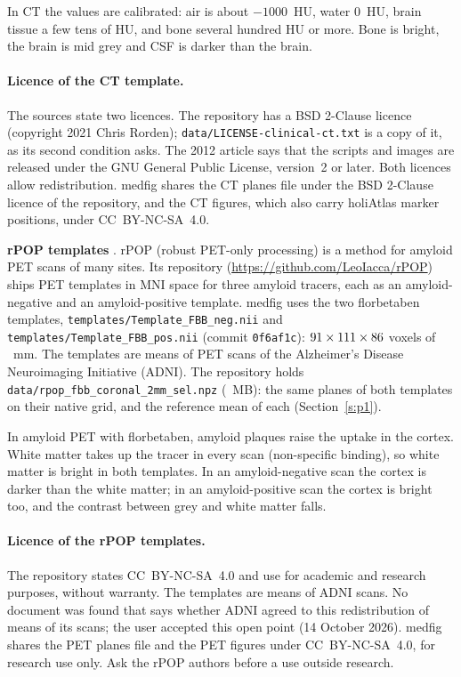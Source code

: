 \documentclass[10pt,a4paper]{article}
\newcommand{\code}[1]{\texttt{#1}}
\begin{document}
In CT the values are calibrated: air is about $-1000$~HU, water 0~HU, brain tissue a few tens of HU, and bone several hundred
HU or more. Bone is bright, the brain is mid grey and CSF is darker than the brain.

\paragraph{Licence of the CT template.} The sources state two licences. The repository has a BSD 2-Clause licence (copyright
2021 Chris Rorden); \nolinkurl{data/LICENSE-clinical-ct.txt} is a copy of it, as its second condition asks. The 2012 article
\cite{rorden2012} says that the scripts and images are released under the GNU General Public License, version~2 or later.
Both licences allow redistribution. medfig shares the CT planes file under the BSD 2-Clause licence of the repository, and the
CT figures, which also carry holiAtlas marker positions, under CC~BY-NC-SA~4.0.

\medskip\noindent
\textbf{rPOP templates} \cite{iaccarino2022}. rPOP (robust PET-only processing) is a method for amyloid PET scans of many
sites. Its repository (\url{https://github.com/LeoIacca/rPOP}) ships PET templates in MNI space for three amyloid tracers, each
as an amyloid-negative and an amyloid-positive template. medfig uses the two florbetaben templates,
\nolinkurl{templates/Template_FBB_neg.nii} and \nolinkurl{templates/Template_FBB_pos.nii} (commit \code{0f6af1c}):
$91\times111\times86$ voxels of \petNativeVs~mm. The templates are means of PET scans of the Alzheimer's
Disease Neuroimaging Initiative (ADNI). The repository holds \nolinkurl{data/rpop_fbb_coronal_2mm_sel.npz} (\petPlanesMB~MB): the
same \petNPlanes{} planes of both templates on their native grid, and the reference mean of each (Section~\ref{s:p1}).

In amyloid PET with florbetaben, amyloid plaques raise the uptake in the cortex. White matter takes up the tracer in every scan
(non-specific binding), so white matter is bright in both templates. In an amyloid-negative scan the cortex is darker than
the white matter; in an amyloid-positive scan the cortex is bright too, and the contrast between grey and white matter falls.

\paragraph{Licence of the rPOP templates.} The repository states CC~BY-NC-SA~4.0 and use for academic and research purposes,
without warranty. The templates are means of ADNI scans. No document was found that says whether ADNI agreed to this
redistribution of means of its scans; the user accepted this open point (14 October 2026). medfig shares the PET planes file
and the PET figures under CC~BY-NC-SA~4.0, for research use only. Ask the rPOP authors before a use outside research.
\end{document}
